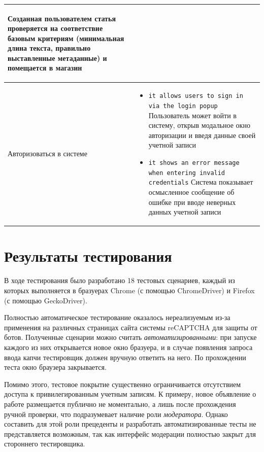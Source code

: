 \documentclass[listings]{labreport}
\begin{document}
\begin{longtable}{L{4.5cm} L{12cm}}
\begin{itemize}[noitemsep,topsep=0em,leftmargin=*]
   Созданная пользователем статья проверяется на соответствие базовым критериям
   (минимальная длина текста, правильно выставленные метаданные) и помещается в магазин
\end{itemize}
  \\\hline
Авторизоваться в системе
   &
\begin{itemize}[noitemsep,topsep=0em,leftmargin=*]
 \item {\small\verb|it allows users to sign in via the login popup|}\newline
   Пользователь может войти в систему, открыв модальное окно авторизации и введя данные
   своей учетной записи
 \item {\small\verb|it shows an error message when entering invalid credentials|}\newline
   Система показывает осмысленное сообщение об ошибке при вводе неверных данных
   учетной записи
\end{itemize}
  \\\hline
\end{longtable}

\section*{Результаты тестирования}

В ходе тестирования было разработано 18 тестовых сценариев, каждый из которых выполняется
в бразуерах Chrome (с помощью ChromeDriver) и Firefox (с помощью GeckoDriver).

Полностью автоматическое тестирование оказалось нереализуемым из-за применения
на различных страницах сайта системы reCAPTCHA для защиты от ботов.
Полученные сценарии можно считать \textit{автоматизированными}: при запуске каждого из них
открывается новое окно бразуера, и в случае появления запроса ввода капчи тестировщик должен
вручную ответить на него. По прохождении теста окно браузера закрывается.

Помимо этого, тестовое покрытие существенно ограничивается отсутствием доступа к привилегированным
учетным записям. К примеру, новое объявление о работе размещается публично не моментально,
а лишь после прохождения ручной проверки, что подразумевает наличие роли \textit{модератора}.
Однако составить для этой роли прецеденты и разработать автоматизированные тесты не представляется возможным,
так как интерфейс модерации полностью закрыт для стороннего тестировщика.
\end{document}

